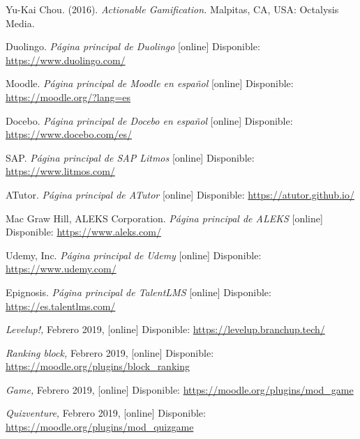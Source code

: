 \begin{thebibliography}{9}
        Yu-Kai Chou. (2016). 
        \textit{Actionable Gamification.}
        Malpitas, CA, USA: Octalysis Media.
\begin{comment}
    
    \bibitem{arte1}
        \textit{Moodle Plugin,}
        Febrero 2019, [online] Disponible: 
        \url{https://moodle.org/plugins/?q=gamification}
    
\end{comment}

    Duolingo. \textit{Página principal de Duolingo} [online] Disponible: \url{https://www.duolingo.com/}

    Moodle. \textit{Página principal de Moodle en español} [online] Disponible:
    \url{https://moodle.org/?lang=es}
    
    Docebo. \textit{Página principal de Docebo en español} [online] Disponible:
    \url{https://www.docebo.com/es/}
    
    SAP. \textit{Página principal de SAP Litmos} [online] Disponible:
    \url{https://www.litmos.com/}

    ATutor. \textit{Página principal de ATutor} [online] Disponible:
    \url{https://atutor.github.io/}

    Mac Graw Hill, ALEKS Corporation. \textit{Página principal de ALEKS} [online] Disponible:    
    \url{https://www.aleks.com/}

    Udemy, Inc. \textit{Página principal de Udemy} [online]  Disponible:
    \url{https://www.udemy.com/}
 
    Epignosis. \textit{Página principal de TalentLMS} [online]  Disponible:
    \url{https://es.talentlms.com/}



        \textit{Levelup!,}
        Febrero 2019, [online] Disponible:  
        \url{https://levelup.branchup.tech/}
    
        \textit{Ranking block,}
        Febrero 2019, [online] Disponible:  
        \url{https://moodle.org/plugins/block_ranking}
    
        \textit{Game,}
        Febrero 2019, [online] Disponible:  
        \url{https://moodle.org/plugins/mod_game}
        
        \textit{Quizventure,}
        Febrero 2019, [online] Disponible:  
        \url{https://moodle.org/plugins/mod_quizgame}
        

\end{thebibliography}

